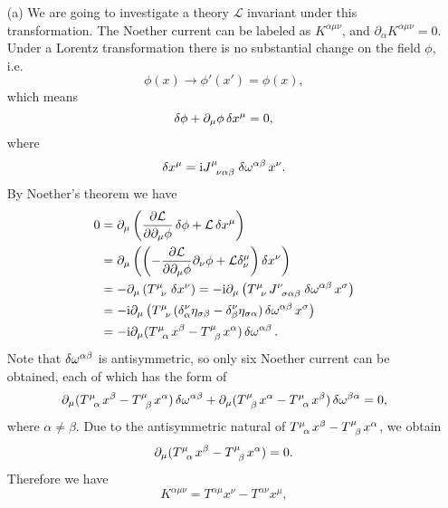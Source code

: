 \documentclass[hyperref, a4paper]{article}
\newcommand*{\ii}{\mathrm{i}}
\begin{document}
\begin{itemize}
    \item[(a)] We are going to investigate a theory $\mathcal{L}$ invariant under this transformation.
    The Noether current can be labeled as $K^{\alpha \mu \nu}$, and $\partial_\alpha K^{\alpha \mu \nu} = 0$.
    Under a Lorentz transformation there is no substantial change on the field $\phi$, i.e.
    \[
        \phi(x) \longrightarrow \phi'(x') = \phi(x), 
    \]
    which means
    \[
        \var{\phi} + \partial_\mu \phi \var{x^\mu} = 0,
    \]
    where
    \[
        \var{x^\mu} = \ii J\indices{^\mu_\nu_\alpha_\beta} \var{\omega^{\alpha \beta}} x^\nu.
    \]
    By Noether's theorem we have 
    \[
        \begin{aligned}
            0 &= \partial_\mu \left( \pdv{\mathcal{L}}{\partial_\mu \phi} \var{\phi} + \mathcal{L} \var{x^\mu} \right) \\
            &= \partial_\mu \left( \left( - \pdv{\mathcal{L}}{\partial_\mu \phi} \partial_\nu \phi  + \mathcal{L} \delta^{\mu}_\nu \right) \var{x^\nu} \right) \\
            &= - \partial_\mu \left( T\indices{^\mu_\nu} \var{x^\nu} \right) = - \ii \partial_\mu \left( T\indices{^\mu_\nu} J\indices{^\nu_\sigma_\alpha_\beta} \var{\omega^{\alpha \beta}} x^\sigma \right) \\
            &= - \ii \partial_\mu \left( T\indices{^\mu_\nu} (\delta^\nu_\alpha \eta_{\sigma \beta} - \delta^\nu_\beta \eta_{\sigma \alpha}) \var{\omega^{\alpha \beta}} x^\sigma \right) \\
            &= - \ii \partial_\mu (T\indices{^\mu_\alpha} x^\beta - T\indices{^\mu_\beta} x^\alpha) \var{\omega^{\alpha \beta}}.
        \end{aligned}
    \]
    Note that $\var{\omega^{\alpha \beta}}$ is antisymmetric, so only six Noether current can be obtained, each of which has the form of 
    \[
        \partial_\mu (T\indices{^\mu_\alpha} x^\beta - T\indices{^\mu_\beta} x^\alpha) \var{\omega^{\alpha \beta}} + \partial_\mu (T\indices{^\mu_\beta} x^\alpha - T\indices{^\mu_\alpha} x^\beta) \var{\omega^{\beta \alpha}} = 0,
    \]
    where $\alpha \neq \beta$. Due to the antisymmetric natural of $T\indices{^\mu_\alpha} x^\beta - T\indices{^\mu_\beta} x^\alpha$, we obtain
    \[
        \partial_\mu (T\indices{^\mu_\alpha} x^\beta - T\indices{^\mu_\beta} x^\alpha) = 0.
    \]
    Therefore we have 
    \begin{equation}
        K^{\alpha \mu \nu} = T^{\alpha \mu} x^\nu - T^{\alpha \nu} x^\mu,

\end{equation}
\end{itemize}
\end{document}
